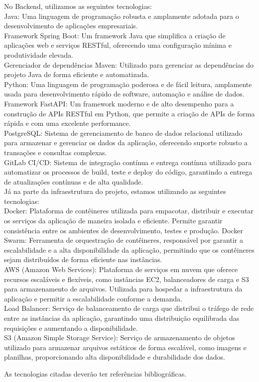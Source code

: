 No Backend, utilizamos as seguintes tecnologias:\\
Java: Uma linguagem de programação robusta e amplamente adotada para o desenvolvimento de aplicações empresariais.\\
Framework Spring Boot: Um framework Java que simplifica a criação de aplicações web e serviços RESTful, oferecendo uma configuração mínima e produtividade elevada.\\
Gerenciador de dependências Maven: Utilizado para gerenciar as dependências do projeto Java de forma eficiente e automatizada.\\
Python: Uma linguagem de programação poderosa e de fácil leitura, amplamente usada para desenvolvimento rápido de software, automação e análise de dados.\\
Framework FastAPI: Um framework moderno e de alto desempenho para a construção de APIs RESTful em Python, que permite a criação de APIs de forma rápida e com uma excelente performance.\\
PostgreSQL: Sistema de gerenciamento de banco de dados relacional utilizado para armazenar e gerenciar os dados da aplicação, oferecendo suporte robusto a transações e consultas complexas.\\
GitLab CI/CD: Sistema de integração contínua e entrega contínua utilizado para automatizar os processos de build, teste e deploy do código, garantindo a entrega de atualizações contínuas e de alta qualidade.\\
	Já na parte da infraestrutura do projeto, estamos utilizando as seguintes tecnologias:\\
Docker: Plataforma de contêineres utilizada para empacotar, distribuir e executar os serviços da aplicação de maneira isolada e eficiente. Permite garantir consistência entre os ambientes de desenvolvimento, testes e produção.
Docker Swarm: Ferramenta de orquestração de contêineres, responsável por garantir a escalabilidade e a alta disponibilidade da aplicação, permitindo que os contêineres sejam distribuídos de forma eficiente nas instâncias.\\
AWS (Amazon Web Services): Plataforma de serviços em nuvem que oferece recursos escaláveis e flexíveis, como instâncias EC2, balanceadores de carga e S3 para armazenamento de arquivos. Utilizada para hospedar a infraestrutura da aplicação e permitir a escalabilidade conforme a demanda.\\
Load Balancer: Serviço de balanceamento de carga que distribui o tráfego de rede entre as instâncias da aplicação, garantindo uma distribuição equilibrada das requisições e aumentando a disponibilidade.\\
S3 (Amazon Simple Storage Service): Serviço de armazenamento de objetos utilizado para armazenar arquivos estáticos de forma escalável, como imagens e planilhas, proporcionando alta disponibilidade e durabilidade dos dados.

  
  As tecnologias citadas deverão ter referências bibliográficas.
